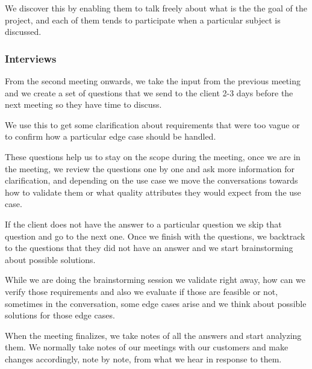 \noindent We discover this by enabling them to talk freely about what is the 
the goal of the project, and each of them tends to participate when a 
particular subject is discussed. \newline

\pagebreak
\subsubsection{Interviews}
From the second meeting onwards, we take the input from the previous meeting 
and we create a set of questions that we send to the client 2-3 days before 
the next meeting so they have time to discuss. \newline

\noindent We use this to get some clarification about requirements that were 
too vague or to confirm how a particular edge case should be handled. \newline

\noindent These questions help us to stay on the scope during the meeting, 
once we are in the meeting, we review the questions one by one and ask more 
information for clarification, and depending on the use case we move the 
conversations towards how to validate them or what quality 
attributes they would expect from the use case. \newline

\noindent If the client does not have the answer to a particular question we 
skip that question and go to the next one. Once we finish with the questions, 
we backtrack to the questions that they did not have an answer and we start 
brainstorming about possible solutions. \newline

\noindent While we are doing the brainstorming session we validate right 
away, how can we verify those requirements and also we evaluate if those are 
feasible or not, sometimes in the conversation, some edge cases arise and we 
think about possible solutions for those edge cases. \newline

\noindent When the meeting finalizes, we take notes of all the answers and 
start analyzing them. We normally take notes of our meetings with our 
customers and make changes accordingly, note by note, from what we hear 
in response to them.